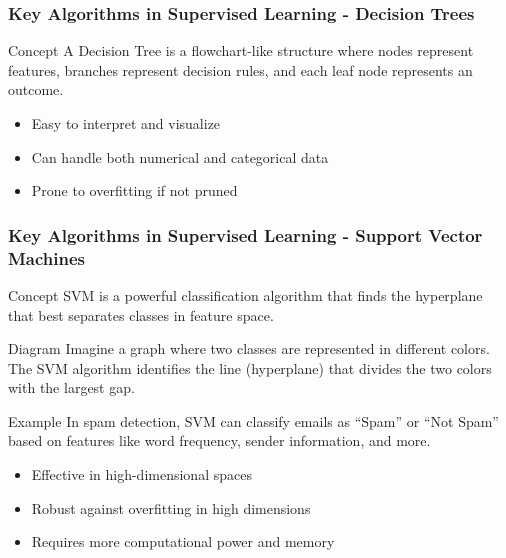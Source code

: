 \documentclass{beamer}
\begin{document}
\begin{frame}[fragile]
    \frametitle{Key Algorithms in Supervised Learning - Decision Trees}
    
    \begin{block}{Concept}
        A Decision Tree is a flowchart-like structure where nodes represent features, branches represent decision rules, and each leaf node represents an outcome.
    \end{block}
    
    
    \begin{itemize}
        \item Easy to interpret and visualize
        \item Can handle both numerical and categorical data
        \item Prone to overfitting if not pruned
    \end{itemize}
\end{frame}

\begin{frame}[fragile]
    \frametitle{Key Algorithms in Supervised Learning - Support Vector Machines}

    \begin{block}{Concept}
        SVM is a powerful classification algorithm that finds the hyperplane that best separates classes in feature space.
    \end{block}
    
    \begin{block}{Diagram}
        Imagine a graph where two classes are represented in different colors. The SVM algorithm identifies the line (hyperplane) that divides the two colors with the largest gap.
    \end{block}
    
    \begin{block}{Example}
        In spam detection, SVM can classify emails as “Spam” or “Not Spam” based on features like word frequency, sender information, and more.
    \end{block}

    \begin{itemize}
        \item Effective in high-dimensional spaces
        \item Robust against overfitting in high dimensions
        \item Requires more computational power and memory
    \end{itemize}
\end{frame}
\end{document}
